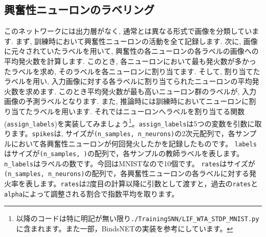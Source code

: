\subsection{興奮性ニューロンのラベリング}
このネットワークには出力層がなく, 通常とは異なる形式で画像を分類しています. まず, 訓練時において興奮性ニューロンの活動を全て記録します. 次に, 画像に元々されていたラベルを用いて, 興奮性の各ニューロンの各ラベルの画像への平均発火数を計算します. このとき, 各ニューロンにおいて最も発火数が多かったラベルを求め, そのラベルを各ニューロンに割り当てます. そして, 割り当てたラベルを用い, 入力画像に対する各ラベルに割り当てられたニューロンの平均発火数を求めます. このとき平均発火数が最も高いニューロン群のラベルが, 入力画像の予測ラベルとなります. また, 推論時には訓練時においてニューロンに割り当てたラベルを用います.
それではニューロンへラベルを割り当てる関数(\texttt{assign\_labels})を実装してみましょう\footnote{以降のコードは特に明記が無い限り\texttt{./TrainingSNN/LIF\_WTA\_STDP\_MNIST.py}に含まれます。また一部，BindsNETの実装を参考にしています。}。\texttt{assign\_labels}は5つの変数を引数に取ります。\texttt{spikes}は, サイズが\texttt{(n\_samples, n\_neurons)}の2次元配列で，各サンプルにおいて各興奮性ニューロンが何回発火したかを記録したものです。 \texttt{labels}はサイズが\texttt{(n\_samples, )}の配列で，各サンプルの教師ラベルを表します。\texttt{n\_labels}はラベルの数です。今回はMNISTなので10個です。 \texttt{rates}はサイズが\texttt{(n\_samples, n\_neurons)}の配列で，各興奮性ニューロンの各ラベルに対する発火率を表します。\texttt{rates}は2度目の計算以降に引数として渡すと，過去の\texttt{rates}と\texttt{alpha}によって調整される割合で指数平均を取ります。
